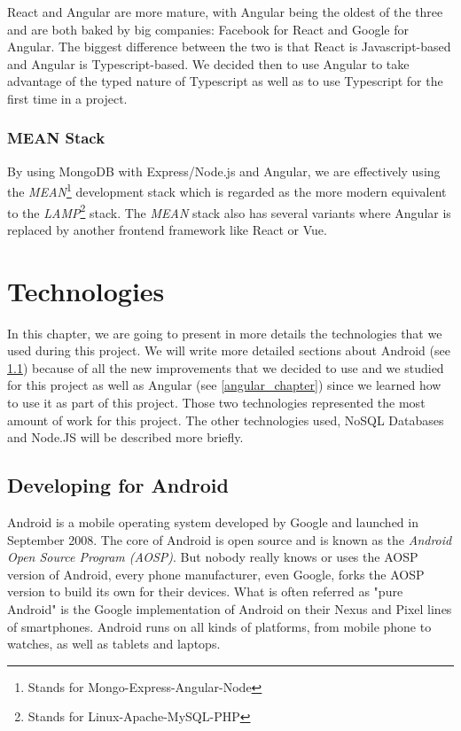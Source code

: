 \documentclass[twoside, openright,11pt,a4paper]{book}
\begin{document}
React and Angular are more mature, with Angular being the oldest of the three and are both baked by big companies: Facebook for React and Google for Angular. The biggest difference between the two is that React is Javascript-based and Angular is Typescript-based. We decided then to use Angular to take advantage of the typed nature of Typescript as well as to use Typescript for the first time in a project. \\

\subsection{MEAN Stack}
By using MongoDB with Express/Node.js and Angular, we are effectively using the \emph{MEAN}\footnote{Stands for Mongo-Express-Angular-Node}\cite{mean:website} development stack which is regarded as the more modern equivalent to the \emph{LAMP}\footnote{Stands for Linux-Apache-MySQL-PHP}\cite{wiki:lamp} stack. The \emph{MEAN} stack also has several variants where Angular is replaced by another frontend framework like React or Vue.

\chapter{Technologies}
In this chapter, we are going to present in more details the technologies that we used during this project. We will write more detailed sections about Android (see \ref{android_chapter}) because of all the new improvements that we decided to use and we studied for this project as well as Angular (see \ref{angular_chapter}) since we learned how to use it as part of this project. Those two technologies represented the most amount of work for this project. The other technologies used, NoSQL Databases and Node.JS will be described more briefly.
\section{Developing for Android}
\label{android_chapter}
Android is a mobile operating system developed by Google and launched in September 2008. The core of Android is open source and is known as the \emph{Android Open Source Program (AOSP)}. But nobody really knows or uses the AOSP version of Android, every phone manufacturer, even Google, forks the AOSP version to build its own for their devices. What is often referred as "pure Android" is the Google implementation of Android on their Nexus and Pixel lines of smartphones. Android runs on all kinds of platforms, from mobile phone to watches, as well as tablets and laptops. \\
\end{document}
